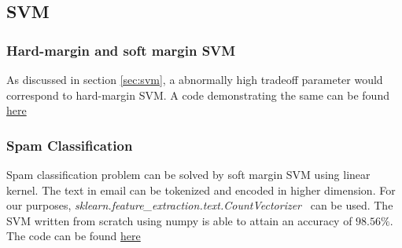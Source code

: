 \documentclass[twoside,twocolumn]{article}
\begin{document}
\subsection{SVM}
\subsubsection{Hard-margin and soft margin SVM}
As discussed in section \eqref{sec:svm}, a abnormally high tradeoff parameter would correspond to hard-margin SVM. A code demonstrating the same can be found \href{https://github.com/cmaspi/subgradient_method/blob/main/code/svm_graphics.ipynb}{here}
\subsubsection{Spam Classification}
Spam classification problem can be solved by soft margin SVM using linear kernel. The text in email can be tokenized and encoded in higher dimension. For our purposes, \emph{sklearn.feature\_extraction.text.CountVectorizer}~\cite{scikit-learn} can be used. The SVM written from scratch using numpy is able to attain an accuracy of $98.56\%$. The code can be found \href{https://github.com/cmaspi/subgradient\_method/blob/main/code/spam\_classification.ipynb}{here}
    
{\small


}
\end{document}
